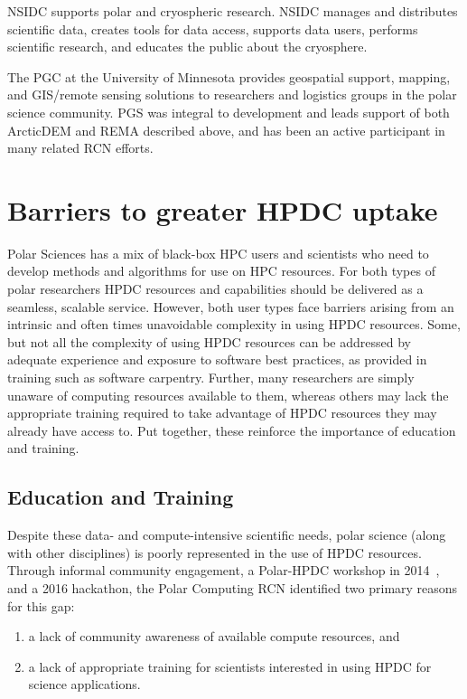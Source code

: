 \documentclass[10pt,letterpaper,draft]{article}
\begin{document}
\begin{description}[style=unboxed]
	\item[National Snow and Ice Data Center (NSIDC):] NSIDC supports polar and cryospheric research. NSIDC manages and distributes scientific data, creates tools for data access, supports data users, performs scientific research, and educates the public about the cryosphere.
 
	\item[Polar Geospatial Center (PGC):] The PGC at the University of Minnesota provides geospatial support, mapping, and GIS/remote sensing solutions to researchers and logistics groups in the polar science community. PGS was integral to development and leads support of both ArcticDEM and REMA described above, and has been an active participant in many related RCN efforts.

\end{description}

\section*{Barriers to greater HPDC uptake}
Polar Sciences has a mix of black-box HPC users and scientists who need to develop methods and algorithms for use on HPC resources. For both types of polar researchers HPDC resources and capabilities should be delivered as a seamless, scalable service. However, both user types face barriers arising from an intrinsic and often times unavoidable complexity in using HPDC resources. Some, but not all the complexity of using HPDC resources can be addressed by adequate experience and exposure to software best practices, as provided in training such as software carpentry. Further, many researchers are simply unaware of computing resources available to them, whereas others may lack the appropriate training required to take advantage of HPDC resources they may already have access to. Put together, these reinforce the importance of education and training.

\subsection*{Education and Training}
Despite these data- and compute-intensive scientific needs, polar science (along with other disciplines) is poorly represented in the use of HPDC resources. Through informal community engagement, a Polar-HPDC workshop in 2014~\cite{hackathon_guide}, and a 2016 hackathon, the Polar Computing RCN identified two primary reasons for this gap:
\begin{enumerate}
\item a lack of community awareness of available compute resources, and
\item a lack of appropriate training for scientists interested in using HPDC for science applications.
\end{enumerate} 
\end{document}
